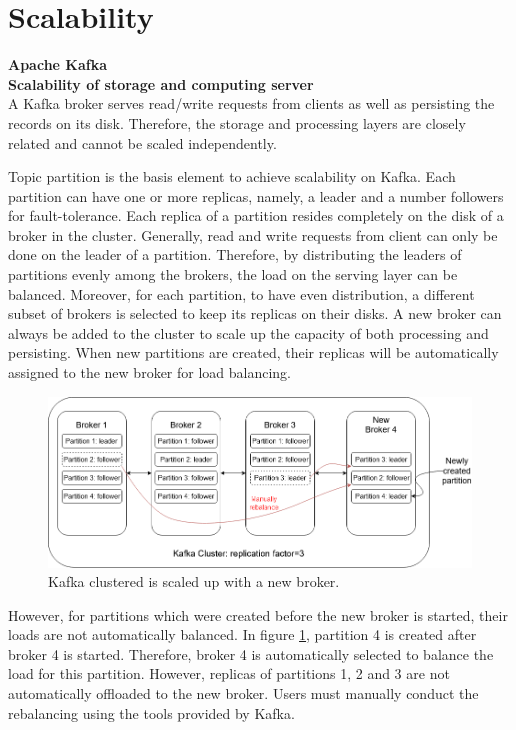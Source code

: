 \section{Scalability} \label{section:scalability}
\large \textbf{Apache Kafka}\\
\normalsize
\textbf{Scalability of storage and computing server}\\
A Kafka broker serves read/write requests from clients as well as persisting the records on its disk. Therefore, the storage and processing layers are closely related and cannot be scaled independently.  

Topic partition is the basis element to achieve scalability on Kafka. Each partition can have one or more replicas, namely, a leader and a number followers for fault-tolerance. Each replica of a partition resides completely on the disk of a broker in the cluster. Generally, read and write requests from client can only be done on the leader of a partition. Therefore, by distributing the leaders of partitions evenly among the brokers, the load on the serving layer can be balanced. Moreover, for each partition, to have even distribution, a different subset of brokers is selected to keep its replicas on their disks. A new broker can always be added to the cluster to scale up the capacity of both processing and persisting. When new partitions are created, their replicas will be automatically assigned to the new broker for load balancing.
\begin{figure}[h]
	\centering
	\includegraphics[width=\linewidth]{images/scalability-kafka.png}
	\caption{Kafka clustered is scaled up with a new broker.}
	\label{fig:scalabilitykafka}
\end{figure}

However, for partitions which were created before the new broker is started, their loads are not automatically balanced. In figure \ref{fig:scalabilitykafka}, partition 4 is created after broker 4 is started. Therefore, broker 4 is automatically selected to balance the load for this partition. However, replicas of partitions 1, 2 and 3 are not automatically offloaded to the new broker. Users must manually conduct the rebalancing using the tools provided by Kafka.


